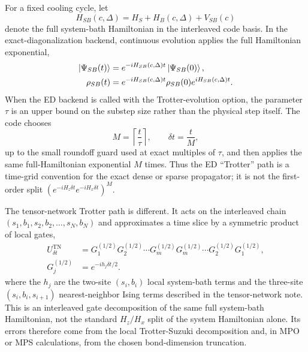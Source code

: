 \documentclass[aps,prx,twocolumn,superscriptaddress,nofootinbib,nolongbibliography,nobalancelastpage,10pt,floatfix]{revtex4-2}
\begin{document}
For a fixed cooling cycle, let
\[
    H_{SB}(c,\Delta)=H_S+H_B(c,\Delta)+V_{SB}(c)
\]
denote the full system-bath Hamiltonian in the interleaved code basis.  In the
exact-diagonalization backend, continuous evolution applies the full
Hamiltonian exponential,
\begin{equation}
    \begin{aligned}
        \ket{\Psi_{SB}(t)}
        &=e^{-iH_{SB}(c,\Delta)t}\ket{\Psi_{SB}(0)},\\
        \rho_{SB}(t)
        &=e^{-iH_{SB}(c,\Delta)t}\rho_{SB}(0)e^{iH_{SB}(c,\Delta)t}.
    \end{aligned}
\end{equation}
When the ED backend is called with the Trotter-evolution option, the parameter
\(\tau\) is an upper bound on the substep size rather than the physical step
itself.  The code chooses
\begin{equation}
    M=\left\lceil \frac{t}{\tau}\right\rceil,\qquad
    \delta t=\frac{t}{M},
    \label{eq:ed_trotter_time_grid}
\end{equation}
up to the small roundoff guard used at exact multiples of \(\tau\), and then
applies the same full-Hamiltonian exponential \(M\) times.  Thus the ED
``Trotter'' path is a time-grid convention for the exact dense or sparse
propagator; it is not the first-order split
\((e^{-iH_z\delta t}e^{-iH_x\delta t})^M\).

The tensor-network Trotter path is different.  It acts on the interleaved chain
\((s_1,b_1,s_2,b_2,\ldots,s_N,b_N)\) and approximates a time slice by a
symmetric product of local gates,
\begin{equation}
    \begin{aligned}
        U_{\delta t}^{\mathrm{TN}}
        &=G_1^{(1/2)}G_2^{(1/2)}\cdots G_m^{(1/2)}
          G_m^{(1/2)}\cdots G_2^{(1/2)}G_1^{(1/2)},\\
        G_j^{(1/2)}
        &=e^{-ih_j\delta t/2}.
    \end{aligned}
\end{equation}
where the \(h_j\) are the two-site \((s_i,b_i)\) local system-bath terms and
the three-site \((s_i,b_i,s_{i+1})\) nearest-neighbor Ising terms described in
the tensor-network note.  This is an interleaved gate decomposition of the
same full system-bath Hamiltonian, not the standard \(H_z/H_x\) split of the
system Hamiltonian alone.  Its errors therefore come from the local
Trotter-Suzuki decomposition and, in MPO or MPS calculations, from the chosen
bond-dimension truncation.
\end{document}

